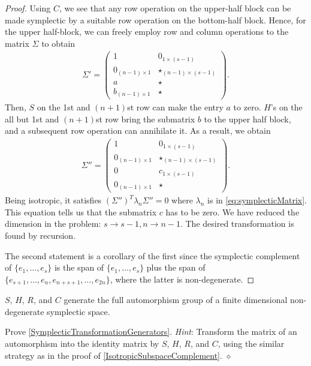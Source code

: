 \begin{proof}
Using $C$, we see that any row operation on the upper-half block can be made
symplectic by a suitable row operation on the bottom-half block.
Hence, for the upper half-block, we can freely employ row and column operations
to the matrix $\Sigma$ to obtain
\begin{align*}
\Sigma' = \begin{pmatrix}
1 & 0_{1 \times (s-1)} \\
0_{(n-1) \times 1} & \star_{(n-1) \times (s-1)} \\
\hline
a & \star \\
b_{(n-1)\times 1} & \star
\end{pmatrix}.
\end{align*}
Then, $S$ on the 1st and $(n+1)$st row can make the entry $a$ to zero.
$H$'s on the all but 1st and $(n+1)$st row bring the submatrix $b$
to the upper half block, and a subsequent row operation can annihilate it.
As a result, we obtain
\begin{align*}
\Sigma'' = \begin{pmatrix}
1 & 0_{1 \times (s-1)} \\
0_{(n-1) \times 1} & \star_{(n-1) \times (s-1)} \\
\hline
0 & c_{1 \times (s-1)} \\
0_{(n-1)\times 1} & \star
\end{pmatrix}.
\end{align*}
Being isotropic, it satisfies $(\Sigma'')^T \lambda_n \Sigma'' = 0$
where $\lambda_n$ is in \eqref{eq:symplecticMatrix}.
This equation tells us that the submatrix $c$ has to be zero.
We have reduced the dimension in the problem: $s \to s-1, n \to n-1$.
The desired transformation is found by recursion.

The second statement is a corollary of the first
since the symplectic complement of $\{e_1,\ldots,e_s\}$
is the span of $\{e_1, \ldots, e_s\}$ plus the span of $\{e_{s+1},\ldots, e_{n}, e_{n+s+1},\ldots,e_{2n}\}$,
where the latter is non-degenerate.
\end{proof}

\begin{prop}
$S$, $H$, $R$, and $C$ generate the full automorphism group of a finite dimensional 
non-degenerate symplectic space.
\label{SymplecticTransformationGenerators}
\end{prop}
\begin{exc}
Prove \ref{SymplecticTransformationGenerators}. 
{\em Hint}:
Transform the matrix of an automorphism
into the identity matrix by $S$, $H$, $R$, and $C$,
using the similar strategy as in the proof of \ref{IsotropicSubspaceComplement}.
\hfill $\diamond$ \end{exc}

